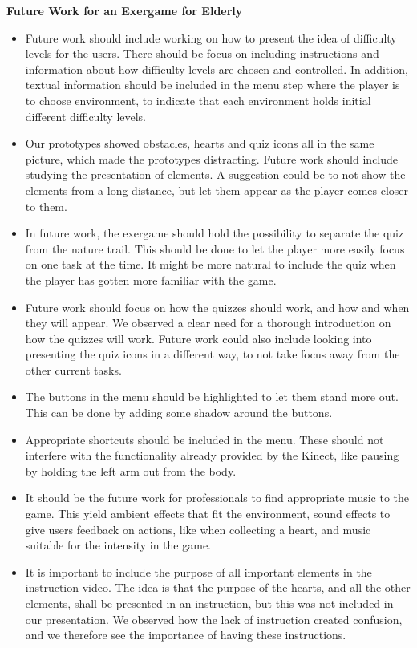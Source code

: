 \textbf{Future Work for an Exergame for Elderly}
\begin{itemize}
\renewcommand{\labelitemi}{$\bullet$}
\item Future work should include working on how to present the idea of difficulty levels for the users. There should be focus on including instructions and information about how difficulty levels are chosen and controlled. In addition, textual information should be included in the menu step where the player is to choose environment, to indicate that each environment holds initial different difficulty levels.  
\item Our prototypes showed obstacles, hearts and quiz icons all in the same picture, which made the prototypes distracting. Future work should include studying the presentation of elements. A suggestion could be to not show the elements from a long distance, but let them appear as the player comes closer to them. 
\item In future work, the exergame should hold the possibility to separate the quiz from the nature trail. This should be done to let the player more easily focus on one task at the time. It might be more natural to include the quiz when the player has gotten more familiar with the game.
\item Future work should focus on how the quizzes should work, and how and when they will appear. We observed a clear need for a thorough introduction on how the quizzes will work. Future work could also include looking into presenting the quiz icons in a different way, to not take focus away from the other current tasks. 
\item The buttons in the menu should be highlighted to let them stand more out. This can be done by adding some shadow around the buttons.
\item Appropriate shortcuts should be included in the menu. These should not interfere with the functionality already provided by the Kinect, like pausing by holding the left arm out from the body.
\item It should be the future work for professionals to find appropriate music to the game. This yield ambient effects that fit the environment, sound effects to give users feedback on actions, like when collecting a heart, and music suitable for the intensity in the game.  
\item It is important to include the purpose of all important elements in the instruction video. The idea is that the purpose of the hearts, and all the other elements, shall be presented in an instruction, but this was not included in our presentation. We observed how the lack of instruction created confusion, and we therefore see the importance of having these instructions.  

\end{itemize}
